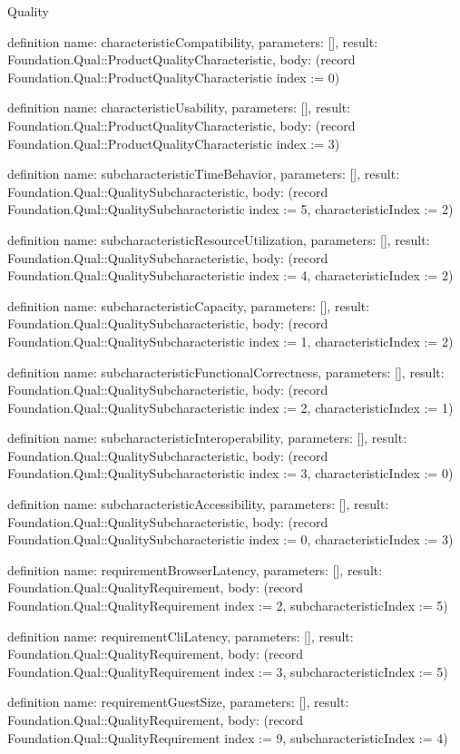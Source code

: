 \begin{lexlean}{Quality}
\begin{semanticmodule}
definition{
  name: characteristicCompatibility,
  parameters: [],
  result: Foundation.Qual::ProductQualityCharacteristic,
  body: (record Foundation.Qual::ProductQualityCharacteristic {index := 0})
}

definition{
  name: characteristicUsability,
  parameters: [],
  result: Foundation.Qual::ProductQualityCharacteristic,
  body: (record Foundation.Qual::ProductQualityCharacteristic {index := 3})
}

definition{
  name: subcharacteristicTimeBehavior,
  parameters: [],
  result: Foundation.Qual::QualitySubcharacteristic,
  body: (record Foundation.Qual::QualitySubcharacteristic {index := 5, characteristicIndex := 2})
}

definition{
  name: subcharacteristicResourceUtilization,
  parameters: [],
  result: Foundation.Qual::QualitySubcharacteristic,
  body: (record Foundation.Qual::QualitySubcharacteristic {index := 4, characteristicIndex := 2})
}

definition{
  name: subcharacteristicCapacity,
  parameters: [],
  result: Foundation.Qual::QualitySubcharacteristic,
  body: (record Foundation.Qual::QualitySubcharacteristic {index := 1, characteristicIndex := 2})
}

definition{
  name: subcharacteristicFunctionalCorrectness,
  parameters: [],
  result: Foundation.Qual::QualitySubcharacteristic,
  body: (record Foundation.Qual::QualitySubcharacteristic {index := 2, characteristicIndex := 1})
}

definition{
  name: subcharacteristicInteroperability,
  parameters: [],
  result: Foundation.Qual::QualitySubcharacteristic,
  body: (record Foundation.Qual::QualitySubcharacteristic {index := 3, characteristicIndex := 0})
}

definition{
  name: subcharacteristicAccessibility,
  parameters: [],
  result: Foundation.Qual::QualitySubcharacteristic,
  body: (record Foundation.Qual::QualitySubcharacteristic {index := 0, characteristicIndex := 3})
}

definition{
  name: requirementBrowserLatency,
  parameters: [],
  result: Foundation.Qual::QualityRequirement,
  body: (record Foundation.Qual::QualityRequirement {index := 2, subcharacteristicIndex := 5})
}

definition{
  name: requirementCliLatency,
  parameters: [],
  result: Foundation.Qual::QualityRequirement,
  body: (record Foundation.Qual::QualityRequirement {index := 3, subcharacteristicIndex := 5})
}

definition{
  name: requirementGuestSize,
  parameters: [],
  result: Foundation.Qual::QualityRequirement,
  body: (record Foundation.Qual::QualityRequirement {index := 9, subcharacteristicIndex := 4})
}


\end{semanticmodule}
\end{lexlean}
